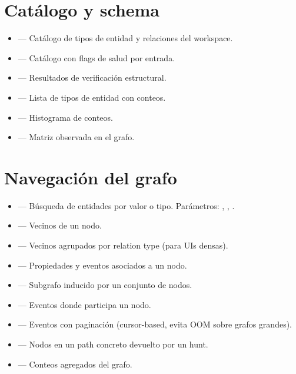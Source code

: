 \section{Catálogo y schema}

\begin{itemize}
    \item {} — Catálogo de tipos de entidad y
    relaciones del workspace.
    \item {} — Catálogo con flags de salud
    por entrada.
    \item {} — Resultados de
    verificación estructural.
    \item {} — Lista de tipos de entidad con
    conteos.
    \item {} — Histograma de conteos.
    \item {} — Matriz
     observada en el grafo.
\end{itemize}

\section{Navegación del grafo}

\begin{itemize}
    \item {} — Búsqueda de entidades por valor o
    tipo. Parámetros: , , .
    \item {} — Vecinos de un nodo.
    \item {} — Vecinos agrupados por
    relation type (para UIs densas).
    \item {} — Propiedades y eventos asociados
    a un nodo.
    \item {} — Subgrafo inducido por un conjunto
    de nodos.
    \item {} — Eventos donde participa un
    nodo.
    \item {} — Eventos con paginación
    (cursor-based, evita OOM sobre grafos grandes).
    \item {} — Nodos en un path concreto devuelto
    por un hunt.
    \item {} — Conteos agregados del grafo.
\end{itemize}

